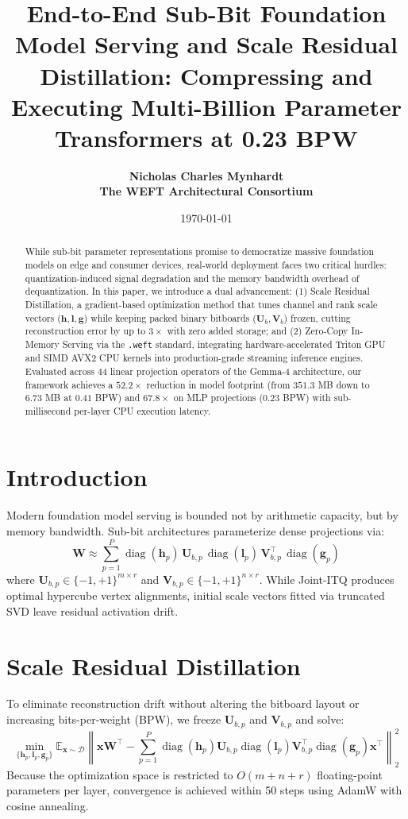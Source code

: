 \documentclass[11pt,a4paper]{article}
\title{\textbf{End-to-End Sub-Bit Foundation Model Serving and Scale Residual Distillation: Compressing and Executing Multi-Billion Parameter Transformers at 0.23 BPW}}
\author{
  \textbf{Nicholas Charles Mynhardt} \\
  \textbf{The WEFT Architectural Consortium}
}
\date{\today}
\begin{document}
\maketitle

\begin{abstract}
While sub-bit parameter representations promise to democratize massive foundation models on edge and consumer devices, real-world deployment faces two critical hurdles: quantization-induced signal degradation and the memory bandwidth overhead of dequantization. In this paper, we introduce a dual advancement: (1) Scale Residual Distillation, a gradient-based optimization method that tunes channel and rank scale vectors ($\mathbf{h}, \mathbf{l}, \mathbf{g}$) while keeping packed binary bitboards ($\mathbf{U}_b, \mathbf{V}_b$) frozen, cutting reconstruction error by up to $3\times$ with zero added storage; and (2) Zero-Copy In-Memory Serving via the \texttt{.weft} standard, integrating hardware-accelerated Triton GPU and SIMD AVX2 CPU kernels into production-grade streaming inference engines. Evaluated across 44 linear projection operators of the Gemma-4 architecture, our framework achieves a $52.2\times$ reduction in model footprint (from $351.3$ MB down to $6.73$ MB at $0.41$ BPW) and $67.8\times$ on MLP projections ($0.23$ BPW) with sub-millisecond per-layer CPU execution latency.
\end{abstract}

\section{Introduction}
Modern foundation model serving is bounded not by arithmetic capacity, but by memory bandwidth. Sub-bit architectures parameterize dense projections via:
\begin{equation}
\mathbf{W} \approx \sum_{p=1}^P \operatorname{diag}(\mathbf{h}_p) \, \mathbf{U}_{b,p} \, \operatorname{diag}(\mathbf{l}_p) \, \mathbf{V}_{b,p}^\top \, \operatorname{diag}(\mathbf{g}_p)
\end{equation}
where $\mathbf{U}_{b,p} \in \{-1, +1\}^{m \times r}$ and $\mathbf{V}_{b,p} \in \{-1, +1\}^{n \times r}$. While Joint-ITQ produces optimal hypercube vertex alignments, initial scale vectors fitted via truncated SVD leave residual activation drift.

\section{Scale Residual Distillation}
To eliminate reconstruction drift without altering the bitboard layout or increasing bits-per-weight (BPW), we freeze $\mathbf{U}_{b,p}$ and $\mathbf{V}_{b,p}$ and solve:
\begin{equation}
\min_{\{\mathbf{h}_p, \mathbf{l}_p, \mathbf{g}_p\}} \mathbb{E}_{\mathbf{x} \sim \mathcal{D}} \left\| \mathbf{x} \mathbf{W}^\top - \sum_{p=1}^P \operatorname{diag}(\mathbf{h}_p) \mathbf{U}_{b,p} \operatorname{diag}(\mathbf{l}_p) \mathbf{V}_{b,p}^\top \operatorname{diag}(\mathbf{g}_p) \mathbf{x}^\top \right\|_2^2
\end{equation}
Because the optimization space is restricted to $O(m + n + r)$ floating-point parameters per layer, convergence is achieved within 50 steps using AdamW with cosine annealing.
\end{document}
